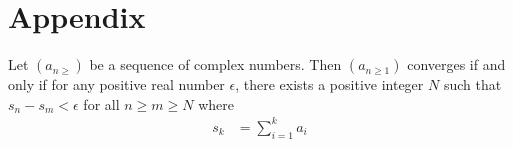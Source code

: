 \documentclass[elemannt.tex]{subfile}
\begin{document}
	\chapter{Appendix}
		\begin{theorem}\label{thm:cauchyconvergence}
			Let $(a_{n\geq})$ be a sequence of complex numbers. Then $(a_{n\geq1})$ converges if and only if for any positive real number $\epsilon$, there exists a positive integer $N$ such that $s_{n}-s_{m}<\epsilon$ for all $n\geq m\geq N$ where
				\begin{align*}
					s_{k}
						& = \sum_{i=1}^{k}a_{i}
				\end{align*}
		\end{theorem}
\end{document}
